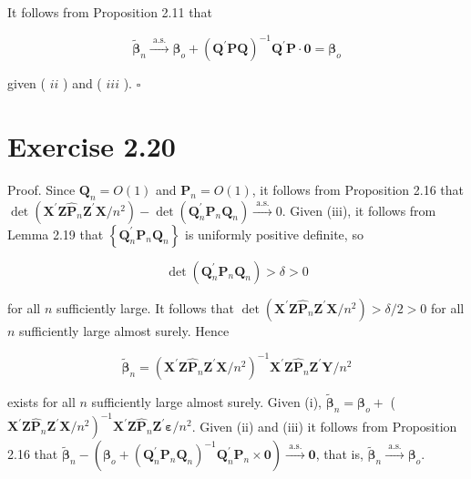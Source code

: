 \documentclass[10pt]{article}
\begin{document}
It follows from Proposition 2.11 that

$$
\tilde{\boldsymbol{\beta}}_{n} \xrightarrow{\text { a.s. }} \boldsymbol{\beta}_{o}+\left(\mathbf{Q}^{\prime} \mathbf{P Q}\right)^{-1} \mathbf{Q}^{\prime} \mathbf{P} \cdot \mathbf{0}=\boldsymbol{\beta}_{o}
$$

given ( $i i$ ) and ( $i i i$ ). \(\square\)

\section*{Exercise 2.20}
Proof. Since $\mathbf{Q}_{n}=O(1)$ and $\mathbf{P}_{n}=O(1)$, it follows from Proposition 2.16 that $\operatorname{det}\left(\mathbf{X}^{\prime} \mathbf{Z} \hat{\mathbf{P}}_{n} \mathbf{Z}^{\prime} \mathbf{X} / n^{2}\right)-\operatorname{det}\left(\mathbf{Q}_{n}^{\prime} \mathbf{P}_{n} \mathbf{Q}_{n}\right) \xrightarrow{\text { a.s. }} 0$. Given (iii), it follows from Lemma 2.19 that $\left\{\mathbf{Q}_{n}^{\prime} \mathbf{P}_{n} \mathbf{Q}_{n}\right\}$ is uniformly positive definite, so

$$
\operatorname{det}\left(\mathbf{Q}_{n}^{\prime} \mathbf{P}_{n} \mathbf{Q}_{n}\right)>\delta>0
$$

for all $n$ sufficiently large. It follows that $\operatorname{det}\left(\mathbf{X}^{\prime} \mathbf{Z} \hat{\mathbf{P}}_{n} \mathbf{Z}^{\prime} \mathbf{X} / n^{2}\right)>\delta / 2>0$ for all $n$ sufficiently large almost surely. Hence

$$
\tilde{\boldsymbol{\beta}}_{n}=\left(\mathbf{X}^{\prime} \mathbf{Z} \hat{\mathbf{P}}_{n} \mathbf{Z}^{\prime} \mathbf{X} / n^{2}\right)^{-1} \mathbf{X}^{\prime} \mathbf{Z} \hat{\mathbf{P}}_{n} \mathbf{Z}^{\prime} \mathbf{Y} / n^{2}
$$

exists for all $n$ sufficiently large almost surely. Given (i), $\tilde{\boldsymbol{\beta}}_{n}=\boldsymbol{\beta}_{o}+$ ( $\left.\mathbf{X}^{\prime} \mathbf{Z} \hat{\mathbf{P}}_{n} \mathbf{Z}^{\prime} \mathbf{X} / n^{2}\right)^{-1} \mathbf{X}^{\prime} \mathbf{Z} \hat{\mathbf{P}}_{n} \mathbf{Z}^{\prime} \boldsymbol{\varepsilon} / n^{2}$. Given (ii) and (iii) it follows from Proposition 2.16 that $\tilde{\boldsymbol{\beta}}_{n}-\left(\boldsymbol{\beta}_{o}+\left(\mathbf{Q}_{n}^{\prime} \mathbf{P}_{n} \mathbf{Q}_{n}\right)^{-1} \mathbf{Q}_{n}^{\prime} \mathbf{P}_{n} \times \mathbf{0}\right) \xrightarrow{\text { a.s. }} \mathbf{0}$, that is, $\tilde{\boldsymbol{\beta}}_{n} \xrightarrow{\text { a.s. }} \boldsymbol{\beta}_{o}$.
\end{document}
